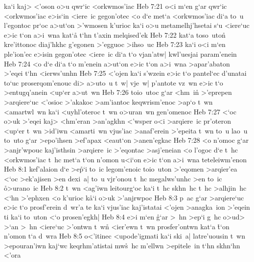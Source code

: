 ka`i
kaj>
<'oson
o>u
qwr`ic
<orkwmos'iac\bibvsend
\vs Heb 7:21
o<i
m`en
g`ar
qwr`ic
<orkwmos'iac
e>is`in
<iere~ic
gegon'otec
<o
d`e
met`a
<orkwmos'iac
di`a
to~u
l'egontoc
pr`oc
a>ut`on
>'wmosen
k'urioc
ka`i
o>u
metamelhj'hsetai
s`u
<iere`uc
e>ic
t`on
a>i~wna
kat`a\r{}
t`hn
t'axin
melqised'ek\bibvsend
\vs Heb 7:22
kat`a
toso~uto\r{n}
kre'ittonoc
diaj'hkhc
g'egonen
>'egguoc
>ihso~uc\bibvsend
\vs Heb 7:23
ka`i
o<i
m`en
ple'ion'ec
e>isin
gegon'otec
<iere~ic
di`a
t`o
vjan'atw|
kwl'uesjai
param'enein\bibvsend
\vs Heb 7:24
<o
d`e
di`a
t`o
m'enein
a>ut`on
e>ic
t`on
a>i~wna
>apar'abaton
>'eqei
t`hn
<ierws'unhn\bibvsend
\vs Heb 7:25
<'ojen
ka`i
s'wzein
e>ic
t`o
pantel`ec
d'unatai
to`uc
proserqom'enouc
di>
a>uto~u
t~w|
vje~w|
p'antote
vz~wn
e>ic
t`o
>entugq'anein
<up`er
a>ut~wn\bibvsend
\vs Heb 7:26
toio~utoc
g`ar
<hm~i\r{n}
>'eprepen
>arqiere`uc
<'osioc
>'akakoc
>am'iantoc
keqwrism'enoc
>ap`o
t~wn
<amartwl~wn
ka`i
<uyhl'oteroc
t~wn
o>uran~wn
gen'omenoc\bibvsend
\vs Heb 7:27
<`oc
o>uk
>'eqei
kaj>
<hm'eran
>an'agkhn
<'wsper
o<i
>arqiere~ic
pr'oteron
<up`er
t~wn
>id'iwn
<amarti~wn
vjus'iac
>anaf'erein
>'epeita
t~wn
to~u
lao~u
to~uto
g`ar
>epo'ihsen
>ef'apax
<eaut`on
>anen'egkac\bibvsend
\vs Heb 7:28
<o
n'omoc
g`ar
>anjr'wpouc
kaj'isthsin
>arqiere~ic
>'eqontac
>asj'eneian
<o
l'ogoc
d`e
t~hc
<orkwmos'iac
t~hc
met`a
t`on
n'omon
u<i`on
e>ic
t`on
a>i~wna
teteleiwm'enon\bibvsend
\vs Heb 8:1
kef'alaion
d`e
>e\r{p}`i
to~ic
legom'enoic
toio~uton
>'eqomen
>arqier'ea
<`oc
>ek'ajisen
>en
dexi~a|
to~u
vjr'onou
t~hc
megalws'unhc
>en
to~ic
\r{o}>urano~ic\bibvsend
{}
\vs Heb 8:2
t~wn
<ag'iwn
leitourg`oc
ka`i
t~hc
skhn~hc
t~hc
>alhjin~hc
<`hn
>'ephxen
<o
k'urioc
k\r{a}`i
o>uk
>'anjrwpoc\bibvsend
\vs Heb 8:3
p~ac
g`ar
>arqiere`uc
e>ic
t`o
prosf'erein
d~wr'a
te
ka`i
vjus'iac
kaj'istatai
<'ojen
>anagka~ion
>'eqein
ti
ka`i
to~uton
<`o
prosen'egkh|\bibvsend
\vs Heb 8:4
e>i
m`en
\r{g}`ar
>~hn
>ep`i
g~hc
o>ud>
>`an
>~hn
<iere`uc
>'ontwn
t~wn\r{}
<ier'ewn
t~wn
prosfer'ontwn
kat`a
\r{t}`on
n'omon
t`a
d~wra\bibvsend
\vs Heb 8:5
o<'itinec
<upode'igmati
ka`i
ski~a|
latre'uousin
t~wn
>epouran'iwn
kaj`wc
keqrhm'atistai
mw\r{s}~hc
m'ellwn
>epitele~in
t`hn
skhn`hn
<'ora
